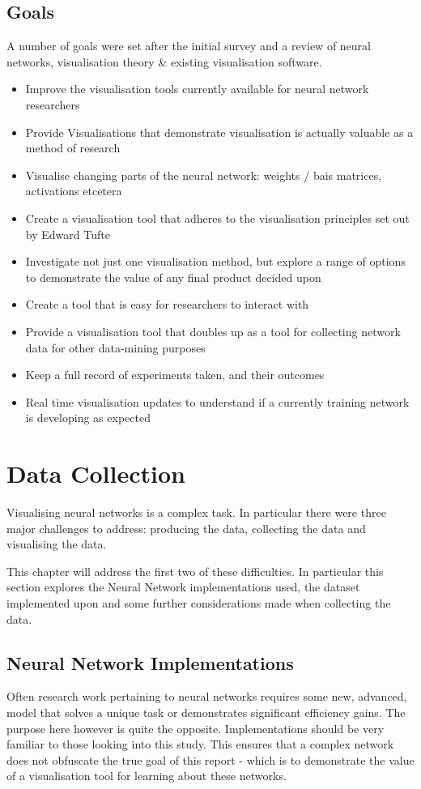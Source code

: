 \documentclass[a4paper,11pt,titlepage]{article}
\begin{document}
	\subsection{Goals}	
	A number of goals were set after the initial survey and a review of neural networks, visualisation theory \& existing visualisation software.
	\par 
	\begin{itemize}
		\item Improve the visualisation tools currently available for neural network researchers
		\item Provide Visualisations that demonstrate visualisation is actually valuable as a method of research
		\item Visualise changing parts of the neural network: weights / bais matrices, activations etcetera
			 \item Create a visualisation tool that adheres to the visualisation principles set out by Edward Tufte
			\item Investigate not just one visualisation method, but explore a range of options to demonstrate the value of any final product decided upon
			\item Create a tool that is easy for researchers to interact with
			\item Provide a visualisation tool that doubles up as a tool for collecting network data for other data-mining purposes
			\item Keep a full record of experiments taken, and their outcomes
			\item Real time visualisation updates to understand if a currently training network is developing as expected
	\end{itemize}	

\clearpage
\section{Data Collection}
	Visualising neural networks is a complex task. In particular there were three major challenges to address: producing the data, collecting the data and visualising the data.
	\par 
	This chapter will address the first two of these difficulties. In particular this section explores the Neural Network implementations used, the dataset implemented upon and some further considerations made when collecting the data.
	
	\subsection{Neural Network Implementations}
	Often research work pertaining to neural networks requires some new, advanced, model that solves a unique task or demonstrates significant efficiency gains. The purpose here however is quite the opposite. Implementations should be very familiar to those looking into this study. This ensures that a complex network does not obfuscate the true goal of this report - which is to demonstrate the value of a visualisation tool for learning about these networks.
	
\end{document}

